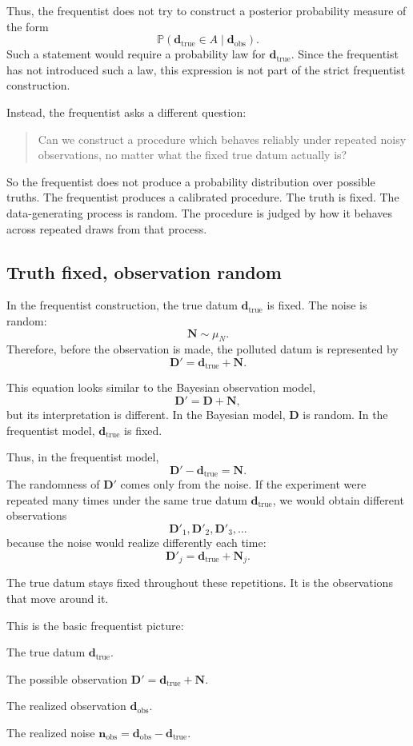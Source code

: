\documentclass[11pt]{article}
\newcommand{\muN}{\mu_N}
\newcommand{\Drand}{\mathbf D}
\newcommand{\Dobsrand}{\mathbf D'}
\newcommand{\Nrand}{\mathbf N}
\newcommand{\dtrue}{\mathbf d_{\mathrm{true}}}
\newcommand{\dobs}{\mathbf d_{\mathrm{obs}}}
\newcommand{\nobs}{\mathbf n_{\mathrm{obs}}}
\newcommand{\Prob}{\mathbb P}
\begin{document}
Thus, the frequentist does not try to construct a posterior probability measure of the form
\[
    \Prob(\dtrue\in A\mid\dobs).
\]
Such a statement would require a probability law for \(\dtrue\). Since the frequentist has not introduced such a law, this expression is not part of the strict frequentist construction.

Instead, the frequentist asks a different question:
\begin{quote}
    Can we construct a procedure which behaves reliably under repeated noisy observations, no matter what the fixed true datum actually is?
\end{quote}

So the frequentist does not produce a probability distribution over possible truths. The frequentist produces a calibrated procedure. The truth is fixed. The data-generating process is random. The procedure is judged by how it behaves across repeated draws from that process.

\subsection{Truth fixed, observation random}

In the frequentist construction, the true datum \(\dtrue\) is fixed. The noise is random:
\[
    \Nrand\sim\muN.
\]
Therefore, before the observation is made, the polluted datum is represented by
\[
    \Dobsrand=\dtrue+\Nrand.
\]

This equation looks similar to the Bayesian observation model,
\[
    \Dobsrand=\Drand+\Nrand,
\]
but its interpretation is different. In the Bayesian model, \(\Drand\) is random. In the frequentist model, \(\dtrue\) is fixed.

Thus, in the frequentist model,
\[
    \Dobsrand-\dtrue=\Nrand.
\]
The randomness of \(\Dobsrand\) comes only from the noise. If the experiment were repeated many times under the same true datum \(\dtrue\), we would obtain different observations
\[
    \Dobsrand_1,
    \Dobsrand_2,
    \Dobsrand_3,
    \dots
\]
because the noise would realize differently each time:
\[
    \Dobsrand_j=\dtrue+\Nrand_j.
\]

The true datum stays fixed throughout these repetitions. It is the observations that move around it.

This is the basic frequentist picture:
\begin{description}[leftmargin=3.0cm,style=nextline]
    \item[Fixed object.]
    The true datum \(\dtrue\).

    \item[Random object.]
    The possible observation \(\Dobsrand=\dtrue+\Nrand\).

    \item[Known object after observation.]
    The realized observation \(\dobs\).

    \item[Hidden object after observation.]
    The realized noise \(\nobs=\dobs-\dtrue\).
\end{description}
\end{document}
